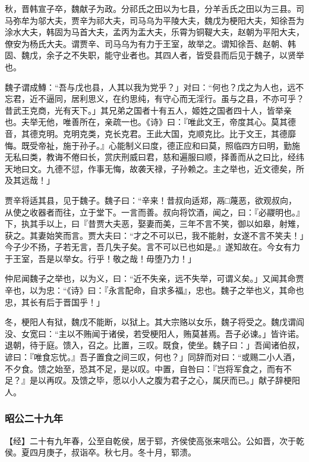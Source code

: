 \documentclass[]{article}
\begin{document}
秋，晋韩宣子卒，魏献子为政。分祁氏之田以为七县，分羊舌氏之田以为三县。司马弥牟为邬大夫，贾辛为祁大夫，司马乌为平陵大夫，魏戊为梗阳大夫，知徐吾为涂水大夫，韩固为马首大夫，孟丙为盂大夫，乐霄为铜鞮大夫，赵朝为平阳大夫，僚安为杨氏大夫。谓贾辛、司马乌为有力于王室，故举之。谓知徐吾、赵朝、韩固、魏戊，余子之不失职，能守业者也。其四人者，皆受县而后见于魏子，以贤举也。

魏子谓成鱄：``吾与戊也县，人其以我为党乎？」对曰：``何也？戊之为人也，远不忘君，近不逼同，居利思义，在约思纯，有守心而无淫行。虽与之县，不亦可乎？昔武王克商，光有天下。」其兄弟之国者十有五人，姬姓之国者四十人，皆举亲也。夫举无他，唯善所在，亲疏一也。《诗》曰：『唯此文王，帝度其心。莫其德音，其德克明。克明克类，克长克君。王此大国，克顺克比。比于文王，其德靡悔。既受帝祉，施于孙子。』心能制义曰度，德正应和曰莫，照临四方曰明，勤施无私曰类，教诲不倦曰长，赏庆刑威曰君，慈和遍服曰顺，择善而从之曰比，经纬天地曰文。九德不愆，作事无悔，故袭天禄，子孙赖之。主之举也，近文德矣，所及其远哉！」

贾辛将适其县，见于魏子。魏子曰：``辛来！昔叔向适郑，鬲□蔑恶，欲观叔向，从使之收器者而往，立于堂下。一言而善。叔向将饮酒，闻之，曰：『必鬷明也。』下，执其手以上，曰『昔贾大夫恶，娶妻而美，三年不言不笑，御以如皋，射雉，获之。其妻始笑而言。贾大夫曰：``才之不可以已，我不能射，女遂不言不笑夫！」今子少不扬，子若无言，吾几失子矣。言不可以已也如是。』遂知故在。今女有力于王室，吾是以举女。行乎！敬之哉！毋堕乃力！」

仲尼闻魏子之举也，以为义，曰：``近不失亲，远不失举，可谓义矣。」又闻其命贾辛也，以为忠：``《诗》曰：『永言配命，自求多福』，忠也。魏子之举也义，其命也忠，其长有后于晋国乎！」

冬，梗阳人有狱，魏戊不能断，以狱上。其大宗赂以女乐，魏子将受之。魏戊谓阎没、女宽曰：``主以不贿闻于诸侯，若受梗阳人，贿莫甚焉。吾子必谏。」皆许诺。退朝，待于庭。馈入，召之。比置，三叹。既食，使坐。魏子曰：」吾闻诸伯叔，谚曰：『唯食忘忧。』吾子置食之间三叹，何也？」同辞而对曰：``或赐二小人酒，不夕食。馈之始至，恐其不足，是以叹。中置，自咎曰：『岂将军食之，而有不足？』是以再叹。及馈之毕，愿以小人之腹为君子之心，属厌而已。」献子辞梗阳人。

\hypertarget{header-n2831}{%
\subsubsection{昭公二十九年}\label{header-n2831}}

【经】二十有九年春，公至自乾侯，居于郓，齐侯使高张来唁公。公如晋，次于乾侯。夏四月庚子，叔诣卒。秋七月。冬十月，郓溃。
\end{document}
